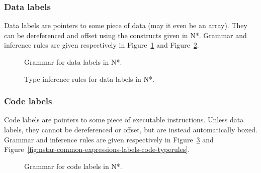 \subsubsection{Data labels}\label{subsubsec:nstar-common-expressions-labels-data}

Data labels are pointers to some piece of data (may it even be an array).
They can be dereferenced and offset using the constructs given in N*.
Grammar and inference rules are given respectively in Figure~\ref{fig:nstar-common-expressions-labels-data-grammar} and Figure~\ref{fig:nstar-common-expressions-labels-data-typerules}.

\begin{figure}[H]
  \centering

  \caption{Grammar for data labels in N*.}
  \label{fig:nstar-common-expressions-labels-data-grammar}
\end{figure}

\begin{figure}[H]
  \centering

  \begin{prooftree}
  \end{prooftree}

  \caption{Type inference rules for data labels in N*.}
  \label{fig:nstar-common-expressions-labels-data-typerules}
\end{figure}

\subsubsection{Code labels}\label{subsubsec:nstar-common-expressions-labels-code}

Code labels are pointers to some piece of executable instructions.
Unless data labels, they cannot be dereferenced or offset, but are instead automatically boxed.
Grammar and inference rules are given respectively in Figure~\ref{fig:nstar-common-expressions-labels-code-grammar} and Figure~\ref{fig:nstar-common-expressions-labels-code-typerules}.

\begin{figure}[H]
  \centering

  \caption{Grammar for code labels in N*.}
  \label{fig:nstar-common-expressions-labels-code-grammar}
\end{figure}

